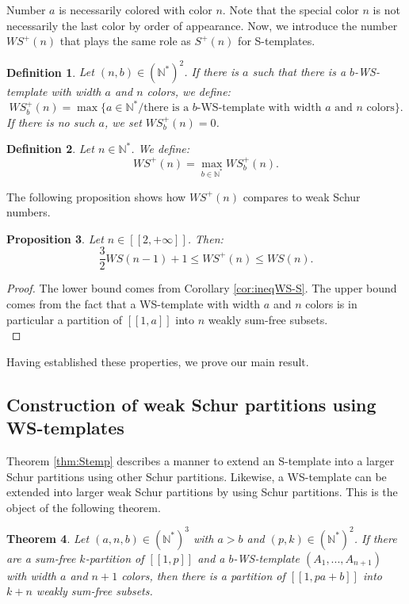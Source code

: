 \documentclass{article}
\newtheorem{definition}{Definition}[section]
\newtheorem{theorem}[definition]{Theorem}
\newtheorem{computational theorem}[definition]{Computational Theorem}
\newtheorem{proposition}[definition]{Proposition}
\newcommand{\WS}{\mathit{WS}}
\begin{document}
Number \(a\) is necessarily colored with color \(n\). Note that the special color \(n\) is not necessarily the last color by order of appearance.
Now, we introduce the number \(\WS^+(n)\) that plays the same role as \(S^+(n)\) for S-templates. 

\begin{definition}
Let \( (n,b) \in (\mathbb{N}^*)^2\). If there is \(a\) such that there is a \(b\)-WS-template with width \(a\)
and \(n\) colors, we define:
\[
\WS_b^+(n)= \max \{a \in \mathbb{N}^*/ \text{there is a } b \text{-WS-template with width } a \text{ and } n \text{ colors} \}.
\]
If there is no such \(a\), we set \(\WS_b^+(n) = 0\).
\end{definition}

\begin{definition}
Let \( n \in \mathbb{N}^*\). We define:
\[
\WS^+(n)=\max_{b\in \mathbb{N}^*} \WS_b^+(n).
\]
\end{definition}
The following proposition shows how \(\WS^+(n)\) compares to weak Schur numbers.
\begin{proposition}
Let \(n \in [\![2, +\infty]\!]\). Then:
\[
\frac{3}{2} \WS (n-1)+1 \leqslant \WS^+(n) \leqslant \WS (n).
\]
\end{proposition}

\begin{proof}
The lower bound comes from Corollary \ref{cor:ineqWS-S}.
The upper bound comes from the fact that a WS-template with width \(a\) and \(n\) colors is in particular a partition of
\([\![1, a]\!]\) into \(n\) weakly sum-free subsets. \\
\end{proof}

Having established these properties, we prove our main result.

\subsection{Construction of weak Schur partitions using WS-templates}
\label{ConstructionWS}

Theorem \ref{thm:Stemp} describes a manner to extend an S-template into a larger Schur partitions using other Schur 
partitions. Likewise, a WS-template can be extended into larger weak Schur partitions by using Schur partitions. This 
is the object of the following theorem.

\begin{theorem}
\label{thm:WStemp}
Let \((a,n,b) \in (\mathbb{N}^*)^3\) with \(a > b\) and \( (p,k) \in (\mathbb{N}^*)^2\). If there are a sum-free \(k\)-partition of
\([\![1,p]\!]\) and a \(b\)-WS-template \((A_1,...,A_{n+1})\) with width \(a\) and \(n+1\) colors,
then there is a partition of \([\![1, p a + b]\!]\) into \(k+n\) weakly sum-free subsets.
\end{theorem}
\end{document}

